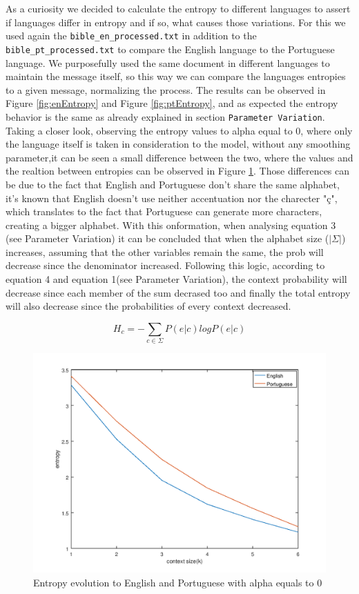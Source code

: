 \documentclass[12pt]{article}
\begin{document}
As a curiosity we decided to calculate the entropy to different languages to assert if languages differ in entropy and if so, what causes those variations. For this we used again the \newline\texttt{bible\_en\_processed.txt} in addition to the \texttt{bible\_pt\_processed.txt} to compare the English language to the Portuguese language. We purposefully used the same document in different languages to maintain the message itself, so this way we can compare the languages entropies to a given message, normalizing the process.
The results can be observed in Figure \ref{fig:enEntropy} and Figure \ref{fig:ptEntropy}, and as expected the entropy behavior is the same as already explained in section \texttt{Parameter Variation}. Taking a closer look, observing the entropy values to alpha equal to 0, where only the language itself is taken in consideration to the model, without any smoothing parameter,it can be seen a small difference between the two, where the values and the realtion between entropies can be observed in Figure \ref{enVSpt}.
Those differences can be due to the fact that English and Portuguese don't share the same alphabet, it's known that English doesn't use neither accentuation nor the charecter "ç", which translates to the fact that Portuguese can generate more characters, creating a bigger alphabet. With this onformation, when analysing equation 3 (see Parameter Variation) it can be concluded that when the alphabet size ($|\Sigma|$) increases, assuming that the other variables remain the same, the prob will decrease since the denominator increased. Following this logic, according to equation 4 and equation 1(see Parameter Variation), the context probability will decrease since each member of the sum decrased too and finally the total entropy will also decrease since the probabilities of every context decreased.

\begin{equation}
  H_{c} = -\sum\limits_{c\in\Sigma} P(e|c) log P(e|c)
\end{equation}

\begin{figure}[h!]
  \includegraphics[width=\linewidth]{ENvsPT.png}
  \caption{Entropy evolution to English and Portuguese with alpha equals to 0}
  \label{enVSpt}
\end{figure}
\end{document}
